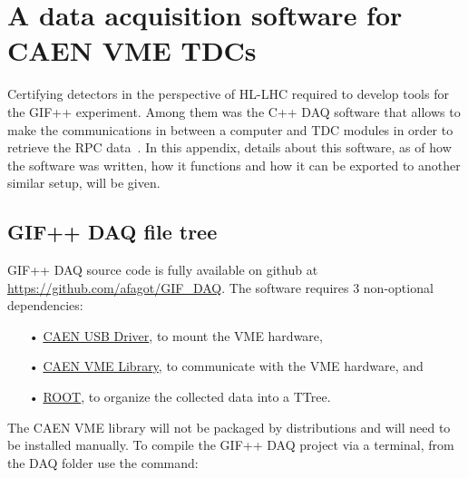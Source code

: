 \graphicspath{{chapt_dutch/}{intro/}{chapt2/}{chapt3/}{chapt4/}{chapt5/}{chapt6/}{chapt7/}}

\renewcommand\evenpagerightmark{{\scshape\small Appendix A}}
\renewcommand\oddpageleftmark{{\scshape\small A data acquisition software for VME CAEN TDCs}}

\renewcommand{\bibname}{References}

\hyphenation{}

\chapter[A data acquisition software for CAEN VME TDCs]%
{A data acquisition software for CAEN VME TDCs}
\label{app1}

Certifying detectors in the perspective of HL-LHC required to develop tools for the GIF++ experiment. Among them was the C++ \acf{DAQ} software that allows to make the communications in between a computer and TDC modules in order to retrieve the RPC data~\cite{GIFDAQ}. In this appendix, details about this software, as of how the software was written, how it functions and how it can be exported to another similar setup, will be given.

\section{GIF++ DAQ file tree}
\label{app1:sec:code}

	GIF++ DAQ source code is fully available on github at \url{https://github.com/afagot/GIF_DAQ}. The software requires 3 non-optional dependencies:

	\begin{itemize}
		\item[•] \href{http://www.caen.it/csite/CaenProd.jsp?idmod=417&parent=11}{CAEN USB Driver}, to mount the VME hardware,
		\item[•] \href{http://www.caen.it/csite/CaenProd.jsp?idmod=689&parent=38}{CAEN VME Library}, to communicate with the VME hardware, and
		\item[•] \href{https://root.cern.ch/downloading-root}{ROOT}, to organize the collected data into a TTree.
	\end{itemize}

	The CAEN VME library will not be packaged by distributions and will need to be installed manually. To compile the GIF++ DAQ project via a terminal, from the DAQ folder use the command:\\

